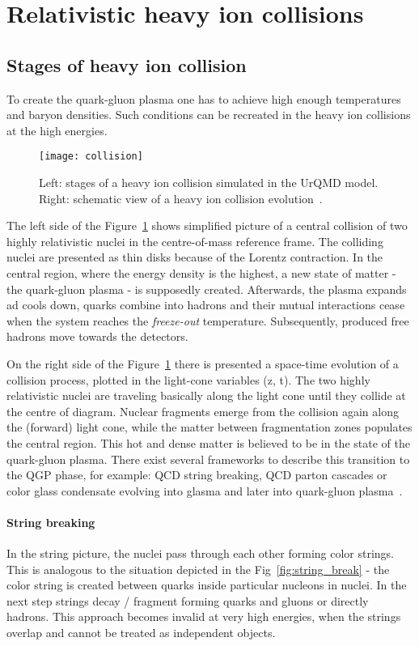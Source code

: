   \section{Relativistic heavy ion collisions}
    \subsection{Stages of heavy ion collision}

      To create the quark-gluon plasma one has to achieve high enough temperatures and baryon densities.
      Such conditions can be recreated in the heavy ion collisions at the high energies.
      \begin{figure}[h]
        \centering
        \texttt{[image: collision]}
        \caption{Left: stages of a heavy ion collision simulated in the UrQMD model. Right: schematic view of a heavy ion collision evolution~\cite{drkisiel}.}
        \label{fig:colision}
      \end{figure}
      The left side of the Figure~\ref{fig:colision} shows simplified picture of a central collision of two highly relativistic nuclei in the centre-of-mass reference frame.
      The colliding nuclei are presented as thin disks because of the Lorentz contraction.
      In the central region, where the energy density is the highest, a new state of matter - the quark-gluon plasma - is supposedly created.
      Afterwards, the plasma expands ad cools down, quarks combine into hadrons and their mutual interactions cease when the system reaches the \textit{freeze-out} temperature.
      Subsequently, produced free hadrons move towards the detectors.

      On the right side of the Figure~\ref{fig:colision} there is presented a space-time evolution of a collision process, plotted in the light-cone variables (z, t).
      The two highly relativistic nuclei are traveling basically along the light cone until they collide at the centre of diagram. 
      Nuclear fragments emerge from the collision again along the (forward) light cone, while the matter between fragmentation zones populates the central region.
      This hot and dense matter is believed to be in the state of the quark-gluon plasma.
      There exist several frameworks to describe this transition to the QGP phase, for example: QCD string breaking, QCD parton cascades or color glass condensate evolving into glasma and later into quark-gluon plasma~\cite{florkowski}.
      \paragraph{String breaking}
      In the string picture, the nuclei pass through each other forming color strings.
      This is analogous to the situation depicted in the Fig~\ref{fig:string_break} -  the color string is created between quarks inside particular nucleons in nuclei.
      In the next step strings decay / fragment forming quarks and gluons or directly hadrons.
      This approach becomes invalid at very high energies, when the strings overlap and cannot be treated as independent objects.
